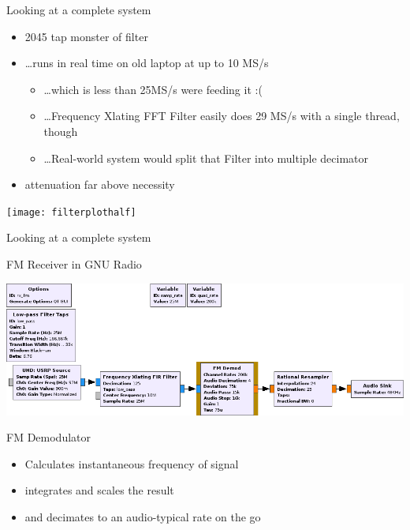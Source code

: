 \documentclass{beamer}
\begin{document}
\begin{frame}{Looking at a complete system}

  {\begin{itemize}
    \item 2045 tap monster of filter
    \item \ldots runs in real time on old laptop at up to 10 MS/s
      \begin{itemize}
        \item \ldots which is less than 25MS/s were feeding it :(
        \item \ldots Frequency Xlating FFT Filter easily does 29 MS/s with a single thread, though
        \item \ldots Real-world system would split that Filter into multiple decimator
      \end{itemize}
    \item attenuation far above necessity
  \end{itemize}}
  {\texttt{[image: filterplothalf]}}

\end{frame}
\begin{frame}{Looking at a complete system}

  FM Receiver in GNU Radio \bigskip

  {\includegraphics[width=\textwidth]{fg_fm_demod}}


  FM Demodulator

  {\begin{itemize}
    \item Calculates instantaneous frequency of signal
    \item integrates and scales the result
    \item and decimates to an audio-typical rate on the go
  \end{itemize}}

\end{frame}
\end{document}
